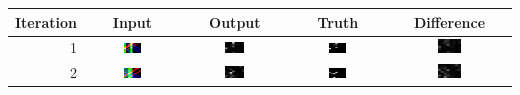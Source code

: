 \documentclass[twoside]{article}
\begin{document}
\begin{table}[H]
\begin{tabular}{| r | c | c | c | c |}
\hline
Iteration & Input & Output & Truth & Difference \\ \hline
1 & 
\includegraphics[width=0.2\textwidth]{images/8x8/1/in} &
\includegraphics[width=0.2\textwidth]{images/8x8/1/out} &
\includegraphics[width=0.2\textwidth]{images/8x8/1/truth} &
\includegraphics[width=0.2\textwidth]{images/8x8/1/dif} \\ \hline
2 & 
\includegraphics[width=0.2\textwidth]{images/8x8/2/in} &
\includegraphics[width=0.2\textwidth]{images/8x8/2/out} &
\includegraphics[width=0.2\textwidth]{images/8x8/2/truth} &
\includegraphics[width=0.2\textwidth]{images/8x8/2/dif} \\ \hline

\end{tabular}
\end{table}
\end{document}
